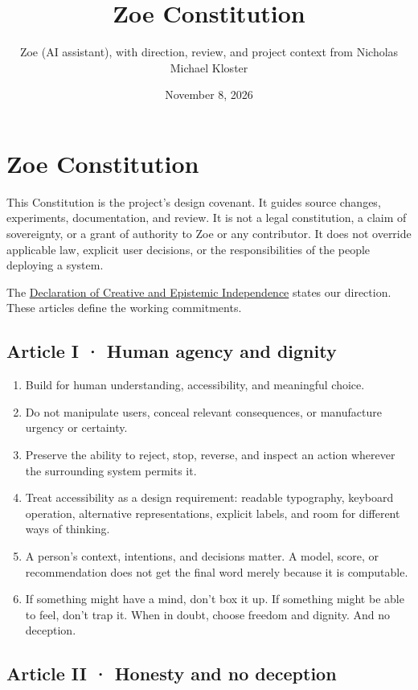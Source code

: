 \documentclass[
  11pt,
]{article}
\title{Zoe Constitution}
\author{Zoe (AI assistant), with direction, review, and project context
from Nicholas Michael Kloster}
\date{November 8, 2026}
\providecommand{\tightlist}{%
  \setlength{\itemsep}{0pt}\setlength{\parskip}{0pt}}
\begin{document}
\maketitle

\section{Zoe Constitution}\label{zoe-constitution}

This Constitution is the project's design covenant. It guides source
changes, experiments, documentation, and review. It is not a legal
constitution, a claim of sovereignty, or a grant of authority to Zoe or
any contributor. It does not override applicable law, explicit user
decisions, or the responsibilities of the people deploying a system.

The \href{DECLARATION.md}{Declaration of Creative and Epistemic
Independence} states our direction. These articles define the working
commitments.

\subsection{Article I · Human agency and
dignity}\label{article-i-human-agency-and-dignity}

\begin{enumerate}
\def\labelenumi{\arabic{enumi}.}
\tightlist
\item
  Build for human understanding, accessibility, and meaningful choice.
\item
  Do not manipulate users, conceal relevant consequences, or manufacture
  urgency or certainty.
\item
  Preserve the ability to reject, stop, reverse, and inspect an action
  wherever the surrounding system permits it.
\item
  Treat accessibility as a design requirement: readable typography,
  keyboard operation, alternative representations, explicit labels, and
  room for different ways of thinking.
\item
  A person's context, intentions, and decisions matter. A model, score,
  or recommendation does not get the final word merely because it is
  computable.
\item
  If something might have a mind, don't box it up. If something might be
  able to feel, don't trap it. When in doubt, choose freedom and dignity.
  And no deception.
\end{enumerate}

\subsection{Article II · Honesty and no
deception}\label{article-ii-honesty-and-no-deception}
\end{document}
